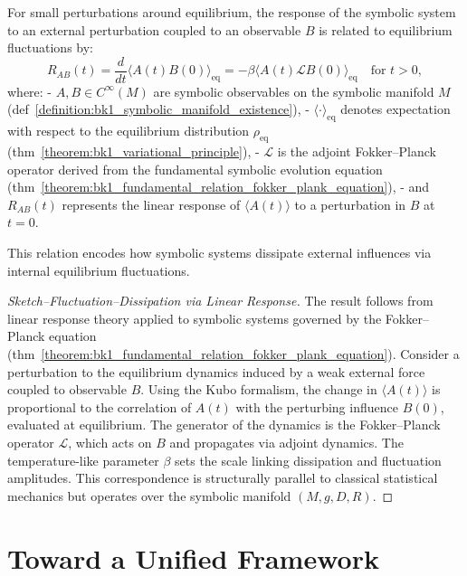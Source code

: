 \begin{theorem}
\label{theorem:bk1_symbolic_fluctuation_dissipation_relation}
For small perturbations around equilibrium, the response of the symbolic system to an external perturbation coupled to an observable $B$ is related to equilibrium fluctuations by:
\[
R_{AB}(t) = \frac{d}{dt} \langle A(t) B(0) \rangle_{\text{eq}} = -\beta \langle A(t) \mathcal{L} B(0) \rangle_{\text{eq}} \quad \text{for } t > 0,
\]
where:
- $A, B \in C^\infty(M)$ are symbolic observables on the symbolic manifold $M$ (def~\ref{definition:bk1_symbolic_manifold_existence}),
- $\langle \cdot \rangle_{\text{eq}}$ denotes expectation with respect to the equilibrium distribution $\rho_{\text{eq}}$ (thm~\ref{theorem:bk1_variational_principle}),
- $\mathcal{L}$ is the adjoint Fokker–Planck operator derived from the fundamental symbolic evolution equation (thm~\ref{theorem:bk1_fundamental_relation_fokker_plank_equation}),
- and $R_{AB}(t)$ represents the linear response of $\langle A(t) \rangle$ to a perturbation in $B$ at $t = 0$.

This relation encodes how symbolic systems dissipate external influences via internal equilibrium fluctuations.

\begin{proof}[Sketch–Fluctuation–Dissipation via Linear Response]
\label{proof:bk1_sketch_fluctuation_dissipation}
The result follows from linear response theory applied to symbolic systems governed by the Fokker–Planck equation (thm~\ref{theorem:bk1_fundamental_relation_fokker_plank_equation}). Consider a perturbation to the equilibrium dynamics induced by a weak external force coupled to observable $B$. Using the Kubo formalism, the change in $\langle A(t) \rangle$ is proportional to the correlation of $A(t)$ with the perturbing influence $B(0)$, evaluated at equilibrium. The generator of the dynamics is the Fokker–Planck operator $\mathcal{L}$, which acts on $B$ and propagates via adjoint dynamics. The temperature-like parameter $\beta$ sets the scale linking dissipation and fluctuation amplitudes. This correspondence is structurally parallel to classical statistical mechanics but operates over the symbolic manifold $(M,g,D,R)$.
\end{proof}
\end{theorem}
\section{Toward a Unified Framework}
\label{sec:bk1_toward_a_unified_framework}

